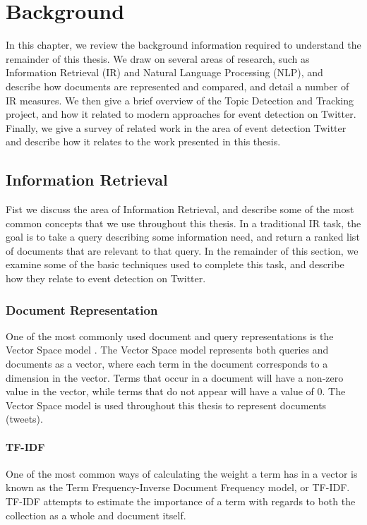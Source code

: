 
\newpage
\chapter{Background}
\label{chapter:background}

In this chapter, we review the background information required to understand the remainder of this thesis.
We draw on several areas of research, such as Information Retrieval (IR) and Natural Language Processing (NLP), and describe how documents are represented and compared, and detail a number of IR measures.
We then give a brief overview of the Topic Detection and Tracking project, and how it related to modern approaches for event detection on Twitter.
Finally, we give a survey of related work in the area of event detection Twitter and describe how it relates to the work presented in this thesis.


\section{Information Retrieval}
Fist we discuss the area of Information Retrieval, and describe some of the most common concepts that we use throughout this thesis.
In a traditional IR task, the goal is to take a query describing some information need, and return a ranked list of documents that are relevant to that query.
In the remainder of this section, we examine some of the basic techniques used to complete this task, and describe how they relate to event detection on Twitter.

\subsection{Document Representation}

One of the most commonly used document and query representations is the Vector Space model \citep{salton1975vector}. The Vector Space model represents both queries and documents as a vector, where each term in the document corresponds to a dimension in the vector.
Terms that occur in a document will have a non-zero value in the vector, while terms that do not appear will have a value of 0.
The Vector Space model is used throughout this thesis to represent documents (tweets).

\subsubsection{TF-IDF}
One of the most common ways of calculating the weight a term has in a vector is known as the Term Frequency-Inverse Document Frequency model, or TF-IDF.
TF-IDF attempts to estimate the importance of a term with regards to both the collection as a whole and document itself.

